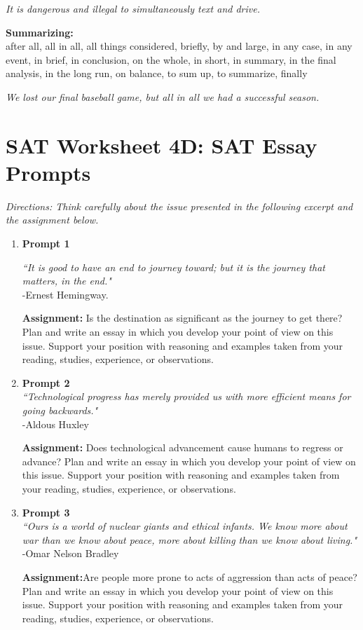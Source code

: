\bigskip
\textit{It is dangerous and illegal to simultaneously text and drive.}

\bigskip
\textbf{Summarizing:}\\
after all, all in all, all things considered, briefly, by and large, in any case, in any event, in brief, in conclusion, on the whole, in short, in summary, in the final analysis, in the long run, on balance, to sum up, to summarize, finally

\bigskip
\textit{We lost our final baseball game, but all in all we had a successful season.}

\pagebreak

\section[Essay Prompts]{SAT Worksheet 4D: SAT Essay Prompts}

\textit{Directions: Think carefully about the issue presented in the following excerpt and the assignment below.}

\begin{enumerate}
\item{\textbf{Prompt 1}}

\textit{``It is good to have an end to journey toward; but it is the journey that matters, in the end."}  \\ 
-Ernest Hemingway.

\bigskip
\textbf{Assignment:} Is the destination as significant as the journey to get there?  Plan and write an essay in which you develop your point of view on this issue.  Support your position with reasoning and examples taken from your reading, studies, experience, or observations.

\item{\textbf{Prompt 2}}\\
\textit{``Technological progress has merely provided us with more efficient means for going backwards."}\\
-Aldous Huxley

\bigskip
\textbf{Assignment:} Does technological advancement cause humans to regress or advance?  Plan and write an essay in which you develop your point of view on this issue.  Support your position with reasoning and examples taken from your reading, studies, experience, or observations.

\item{\textbf{Prompt 3}}\\
\textit{``Ours is a world of nuclear giants and ethical infants. We know more about war than we know about peace, more about killing than we know about living."}\\
-Omar Nelson Bradley

\bigskip
\textbf{Assignment:}Are people more prone to acts of aggression than acts of peace?  Plan and write an essay in which you develop your point of view on this issue.  Support your position with reasoning and examples taken from your reading, studies, experience, or observations.
\end{enumerate}
